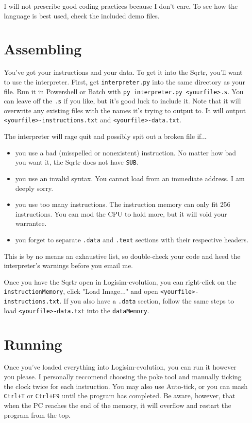 \documentclass[12pt, oneside]{memoir}
\newcommand{\instruction}[1]{{\color{instruction}\texttt{#1}}}
\newcommand{\header}[1]{{\color{header}\texttt{#1}}}
\begin{document}
I will not prescribe good coding practices because I don't care. To see how the language is best used, check the included demo files.

\chapter{Assembling}
\label{s2}
You've got your instructions and your data. To get it into the Sqrtr, you'll want to use the interpreter. First, get \texttt{interpreter.py} into the same directory as your file. Run it in Powershell or Batch with \texttt{py interpreter.py <yourfile>.s}. You can leave off the \texttt{.s} if you like, but it's good luck to include it. Note that it will overwrite any existing files with the names it's trying to output to. It will output \texttt{<yourfile>-instructions.txt} and \texttt{<yourfile>-data.txt}.

The interpreter will rage quit and possibly spit out a broken file if...
\begin{itemize}
    \item you use a bad (misspelled or nonexistent) instruction. No matter how bad you want it, the Sqrtr does not have \instruction{SUB}.
    \item you use an invalid syntax. You cannot load from an immediate address. I am deeply sorry.
    \item you use too many instructions. The instruction memory can only fit 256 instructions. You can mod the CPU to hold more, but it will void your warrantee.
    \item you forget to separate \header{.data} and \header{.text} sections with their respective headers.
\end{itemize}

This is by no means an exhaustive list, so double-check your code and heed the interpreter's warnings before you email me.

Once you have the Sqrtr open in Logisim-evolution, you can right-click on the \texttt{instructionMemory}, click "Load Image..." and open \texttt{<yourfile>-instructions.txt}. If you also have a \header{.data} section, follow the same steps to load \texttt{<yourfile>-data.txt} into the \texttt{dataMemory}.

\chapter{Running}
Once you've loaded everything into Logisim-evolution, you can run it however you please. I personally reccomend choosing the poke tool and manually ticking the clock twice for each instruction. You may also use Auto-tick, or you can mash \texttt{Ctrl+T} or \texttt{Ctrl+F9} until the program has completed. Be aware, however, that when the PC reaches the end of the memory, it will overflow and restart the program from the top. 
\end{document}
